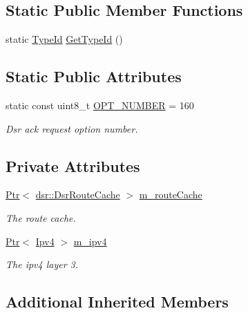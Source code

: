 \subsection*{Static Public Member Functions}
\begin{DoxyCompactItemize}
\item 
static \hyperlink{classns3_1_1TypeId}{Type\+Id} \hyperlink{classns3_1_1dsr_1_1DsrOptionAckReq_a11f693334e9c97af3c4b005d79e1c934}{Get\+Type\+Id} ()
\end{DoxyCompactItemize}
\subsection*{Static Public Attributes}
\begin{DoxyCompactItemize}
\item 
static const uint8\+\_\+t \hyperlink{classns3_1_1dsr_1_1DsrOptionAckReq_a57823bec17c2c58a4f95a673528e877c}{O\+P\+T\+\_\+\+N\+U\+M\+B\+ER} = 160
\begin{DoxyCompactList}\small\item\em Dsr ack request option number. \end{DoxyCompactList}\end{DoxyCompactItemize}
\subsection*{Private Attributes}
\begin{DoxyCompactItemize}
\item 
\hyperlink{classns3_1_1Ptr}{Ptr}$<$ \hyperlink{classns3_1_1dsr_1_1DsrRouteCache}{dsr\+::\+Dsr\+Route\+Cache} $>$ \hyperlink{classns3_1_1dsr_1_1DsrOptionAckReq_a5f19e75a872208c9910702d56e39430a}{m\+\_\+route\+Cache}
\begin{DoxyCompactList}\small\item\em The route cache. \end{DoxyCompactList}\item 
\hyperlink{classns3_1_1Ptr}{Ptr}$<$ \hyperlink{classns3_1_1Ipv4}{Ipv4} $>$ \hyperlink{classns3_1_1dsr_1_1DsrOptionAckReq_a8660a574e62855c72c0a4fa6b60bfc56}{m\+\_\+ipv4}
\begin{DoxyCompactList}\small\item\em The ipv4 layer 3. \end{DoxyCompactList}\end{DoxyCompactItemize}
\subsection*{Additional Inherited Members}


